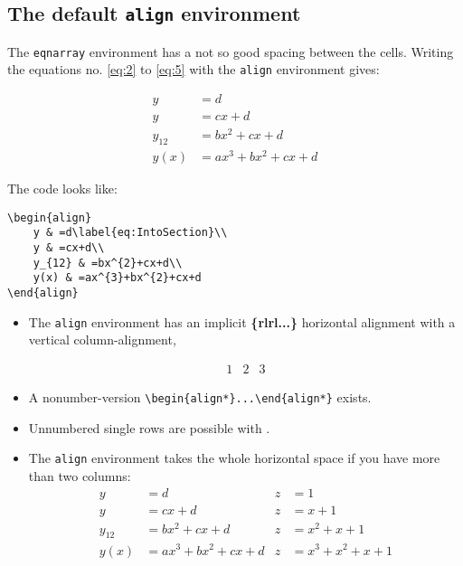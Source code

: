 \begin{table}[htb]
\subsection{The default \texttt{align} environment}

The \texttt{eqnarray} environment has a not so good spacing between
the cells. Writing the equations no. \ref{eq:2} to \ref{eq:5} with
the \texttt{align} environment gives:

\begin{align}
	y & =d\label{eq:IntoSection}\\
	y & =cx+d\\
	y_{12} & =bx^{2}+cx+d\\
	y(x) & =ax^{3}+bx^{2}+cx+d
\end{align}

\noindent The code looks like:
\begin{lstlisting}
\begin{align}
	y & =d\label{eq:IntoSection}\\
	y & =cx+d\\
	y_{12} & =bx^{2}+cx+d\\
	y(x) & =ax^{3}+bx^{2}+cx+d
\end{align}
\end{lstlisting}

\begin{itemize}
\item The \texttt{align} environment has an implicit \textbf{\{rlrl...\}}
horizontal alignment with a vertical column-alignment, \eg
\begin{LTXexample}[width=0.5\linewidth]
\begin{align*}
  1 & 2 & 3
\end{align*}
\end{LTXexample}

\item A nonumber-version \texttt{\small \textbackslash{}begin\{align{*}\}...\textbackslash{}end\{align{*}\}}
exists.
\item Unnumbered single rows are possible with .    %
\item The \texttt{align} environment takes the whole horizontal space if
you have more than two columns:
\begin{align}
y & =d & z & =1\\
y & =cx+d & z & =x+1\\
y_{12} & =bx^{2}+cx+d & z & =x^{2}+x+1\nonumber \\
y(x) & =ax^{3}+bx^{2}+cx+d & z & =x^{3}+x^{2}+x+1
\end{align}


\end{itemize}
\end{table}

